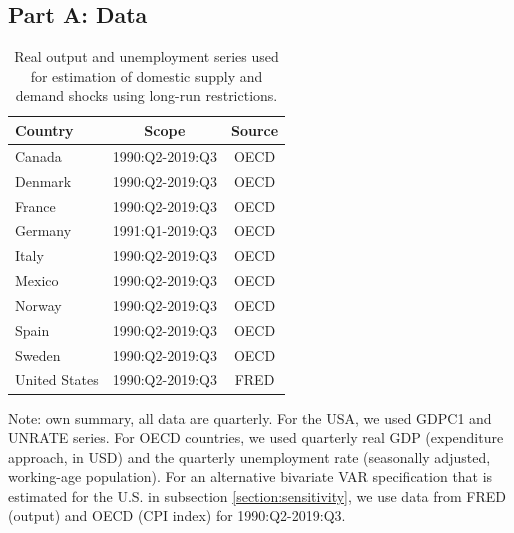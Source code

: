 \documentclass[12pt, a4paper]{article}
\begin{document}
\subsection*{Part A: Data} \label{appendix:a}
\begin{table}[H]
\captionsetup{justification=raggedright, singlelinecheck=false}
    \centering
    \caption{Real output and unemployment series used for estimation of domestic supply and demand shocks using long-run restrictions.}
    \begin{tabular}{lcc}
    \toprule
       Country & Scope & Source  \\
    \midrule
       Canada  & 1990:Q2-2019:Q3 & OECD \\
       Denmark & 1990:Q2-2019:Q3 & OECD \\
       France  & 1990:Q2-2019:Q3 & OECD \\
       Germany & 1991:Q1-2019:Q3 & OECD \\
       Italy   & 1990:Q2-2019:Q3 & OECD \\
       Mexico  & 1990:Q2-2019:Q3 & OECD \\
       Norway  & 1990:Q2-2019:Q3 & OECD \\
       Spain   & 1990:Q2-2019:Q3 & OECD \\
       Sweden  & 1990:Q2-2019:Q3 & OECD \\
       United States & 1990:Q2-2019:Q3 & FRED \\
    \bottomrule 
    \end{tabular}
    \begin{minipage}{\textwidth}
    \vspace{0.1cm}
    \footnotesize Note: own summary, all data are quarterly. For the USA, we used GDPC1 and UNRATE series. For OECD countries, we used quarterly real GDP (expenditure approach, in USD) and the quarterly unemployment rate (seasonally adjusted, working-age population). For an alternative bivariate VAR specification that is estimated for the U.S. in subsection \ref{section:sensitivity}, we use data from FRED (output) and OECD (CPI index) for 1990:Q2-2019:Q3.
    \end{minipage}
    \label{table:a1}
\end{table}

\end{document}
